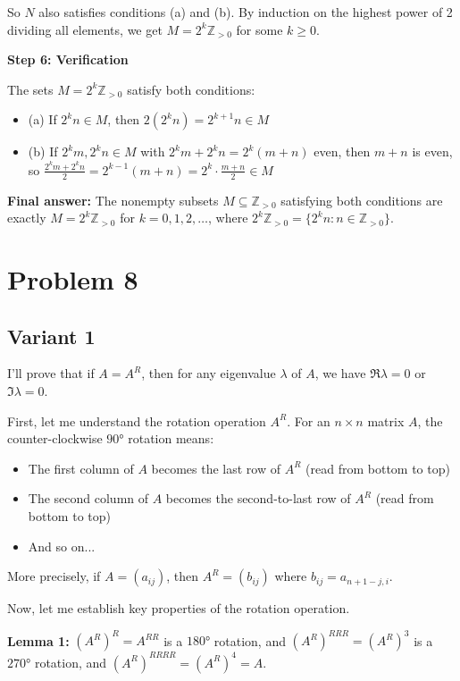 \documentclass[12pt,a4paper]{article}
\theoremstyle{definition}
\begin{document}
        So $N$ also satisfies conditions (a) and (b). By induction on the highest power of 2 dividing all elements, we get $M = 2^k \mathbb{Z}_{>0}$ for some $k \geq 0$.

        \textbf{Step 6: Verification}

        The sets $M = 2^k \mathbb{Z}_{>0}$ satisfy both conditions:
        \begin{itemize}
            \item (a) If $2^k n \in M$, then $2(2^k n) = 2^{k+1} n \in M$ \checkmark
            \item (b) If $2^k m, 2^k n \in M$ with $2^k m + 2^k n = 2^k(m + n)$ even, then $m + n$ is even, so $\frac{2^k m + 2^k n}{2} = 2^{k-1}(m + n) = 2^k \cdot \frac{m + n}{2} \in M$ \checkmark
        \end{itemize}

        \textbf{Final answer:} The nonempty subsets $M \subseteq \mathbb{Z}_{>0}$ satisfying both conditions are exactly $M = 2^k \mathbb{Z}_{>0}$ for $k = 0, 1, 2, \ldots$, where $2^k \mathbb{Z}_{>0} = \{2^k n : n \in \mathbb{Z}_{>0}\}$.


\section{Problem 8}
\subsection{Variant 1}
    I'll prove that if $A = A^R$, then for any eigenvalue $\lambda$ of $A$, we have $\Re\lambda = 0$ or $\Im\lambda = 0$.

    First, let me understand the rotation operation $A^R$. For an $n \times n$ matrix $A$, the counter-clockwise $90°$ rotation means:
    \begin{itemize}
        \item The first column of $A$ becomes the last row of $A^R$ (read from bottom to top)
        \item The second column of $A$ becomes the second-to-last row of $A^R$ (read from bottom to top)
        \item And so on...
    \end{itemize}

    More precisely, if $A = (a_{ij})$, then $A^R = (b_{ij})$ where $b_{ij} = a_{n+1-j,i}$.

    Now, let me establish key properties of the rotation operation.

    \textbf{Lemma 1:} $(A^R)^R = A^{RR}$ is a $180°$ rotation, and $(A^R)^{RRR} = (A^R)^3$ is a $270°$ rotation, and $(A^R)^{RRRR} = (A^R)^4 = A$.
\end{document}
